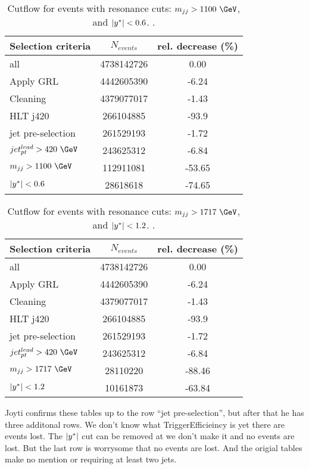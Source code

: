 \begin{table}[htbp]
	\centering
	\begin{tabular}{l|c|c}
		\hline\hline
		Selection criteria & $N_{events}$ & rel. decrease (\%) \\
		\hline
		all      &	4738142726	&	0.00	\\
		Apply GRL 	& 	4442605390        & 	-6.24	 \\
		Cleaning	 & 	4379077017	 & 	-1.43	 \\
		HLT j420	 & 	266104885	 & 	-93.9	 \\
		jet pre-selection	 &     261529193        &      -1.72    \\
		$jet_{pt}^{lead}>420~\GeV$ &   243625312	 & -6.84 \\
		$\mjj>1100~\GeV$	 & 	112911081	 & 	-53.65	 \\
		$|y^\ast| < 0.6$	 & 	28618618	 & 	-74.65	 \\
		\hline\hline
	\end{tabular}
	\caption{Cutflow for
		events with resonance cuts:  $m_{jj}>1100~\GeV$, and $|y^\ast|<0.6$. .
		\label{tab:cutFlow_resonance_run2} }
\end{table}

\begin{table}[htbp]
	\centering
	\begin{tabular}{l|c|c}
		\hline\hline
		Selection criteria & $N_{events}$ & rel. decrease (\%) \\
		\hline
		all      &	4738142726	&	0.00	\\
		Apply GRL 	& 	4442605390        & 	-6.24	 \\
		Cleaning	 & 	4379077017	 & 	-1.43	 \\
		HLT j420	 & 	266104885	 & 	-93.9	 \\
		jet pre-selection	 &     261529193        &      -1.72    \\
		$jet_{pt}^{lead}>420~\GeV$ &   243625312	 & -6.84 \\
		$\mjj>1717~\GeV$	 & 	28110220	 & 	-88.46	 \\
		$|y^\ast| < 1.2$	 & 	10161873	 & 	-63.84	 \\
		\hline\hline
	\end{tabular}
	\caption{Cutflow for
		events with \Wstar resonance cuts:  $\mjj>1717~\GeV$, and $|y^\ast|<1.2$. .
		\label{tab:cutFlow_wstar_run2} }
\end{table}

Joyti confirms these tables up to the row ``jet pre-selection'', but after that he has three additonal rows.
We don't know what TriggerEfficieincy is yet there are events lost. The $|y^\ast|$ cut can be removed at we don't make it and no events are lost. 
But the last row is worrysome that no events are lost.
And the origial tables make no mention or requiring at least two jets.

